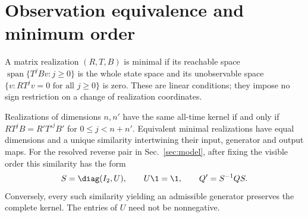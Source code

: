 \section{Observation equivalence and minimum order}\label{app:realization}
A matrix realization $(R,T,B)$ is minimal if its reachable space
$\operatorname{span}\{T^jBv:j\ge0\}$ is the whole state space and its
unobservable space $\{v:RT^jv=0\text{ for all }j\ge0\}$ is zero.
These are linear conditions; they impose no sign restriction on a change
of realization coordinates.

\begin{lemma}\label{lem:orbit}
Realizations of dimensions $n,n'$ have the same all-time kernel if and only
if $RT^jB=R'T'^jB'$ for $0\le j<n+n'$. Equivalent minimal realizations have
equal dimensions and a unique similarity intertwining their input,
generator and output maps. For the resolved reverse pair in
Sec.~\ref{sec:model}, after fixing the visible order this similarity has
the form
\begin{equation}
 S=\diag(I_2,U),\qquad U\1=\1,\qquad Q'=S^{-1}QS.\label{eq:orbit}
\end{equation}
Conversely, every such similarity yielding an admissible generator
preserves the complete kernel. The entries of $U$ need not be nonnegative.
\end{lemma}
